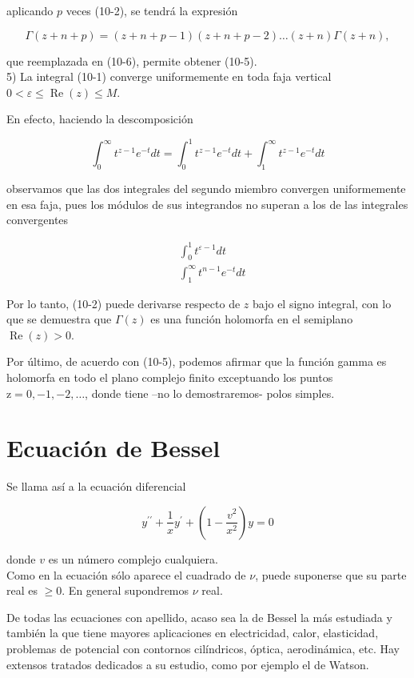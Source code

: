 \documentclass[10pt]{article}
\theoremstyle{plain}
\theoremstyle{definition}
\theoremstyle{remark}
\begin{document}
aplicando $p$ veces (10-2), se tendrá la expresión

$$
\Gamma(z+n+p)=(z+n+p-1)(z+n+p-2) \ldots(z+n) \Gamma(z+n),
$$

que reemplazada en (10-6), permite obtener (10-5).\\
5) La integral (10-1) converge uniformemente en toda faja vertical $0<\varepsilon \leqslant \operatorname{Re}(z) \leqslant M$.

En efecto, haciendo la descomposición

$$
\int_{0}^{\infty} t^{z-1} e^{-t} d t=\int_{0}^{1} t^{z-1} e^{-t} d t+\int_{1}^{\infty} t^{z-1} e^{-t} d t
$$

observamos que las dos integrales del segundo miembro convergen uniformemente en esa faja, pues los módulos de sus integrandos no superan a los de las integrales convergentes

$$
\begin{aligned}
& \int_{0}^{1} t^{\varepsilon-1} d t \\
& \int_{1}^{\infty} t^{n-1} e^{-t} d t
\end{aligned}
$$

Por lo tanto, (10-2) puede derivarse respecto de $z$ bajo el signo integral, con lo que se demuestra que $\Gamma(z)$ es una función holomorfa en el semiplano $\operatorname{Re}(z)>0$.

Por último, de acuerdo con (10-5), podemos afirmar que la función gamma es holomorfa en todo el plano complejo finito exceptuando los puntos $\mathrm{z}=0,-1,-2, \ldots$, donde tiene --no lo demostraremos- polos simples.

\section{Ecuación de Bessel}
Se llama así a la ecuación diferencial


\begin{equation*}
y^{\prime \prime}+\frac{1}{x} y^{\prime}+\left(1-\frac{v^{2}}{x^{2}}\right) y=0 \tag{11-1}
\end{equation*}


donde $v$ es un número complejo cualquiera.\\
Como en la ecuación sólo aparece el cuadrado de $\nu$, puede suponerse que su parte real es $\geqslant 0$. En general supondremos $\nu$ real.

De todas las ecuaciones con apellido, acaso sea la de Bessel la más estudiada y también la que tiene mayores aplicaciones en electricidad, calor, elasticidad, problemas de potencial con contornos cilíndricos, óptica, aerodinámica, etc. Hay extensos tratados dedicados a su estudio, como por ejemplo el de Watson.
\end{document}
